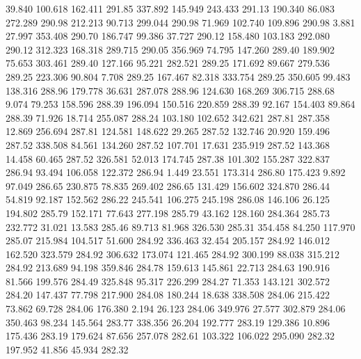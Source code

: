   39.840  100.618  162.411       291.85
 337.892  145.949  243.433       291.13
 190.340   86.083  272.289       290.98
 212.213   90.713  299.044       290.98
  71.969  102.740  109.896       290.98
   3.881   27.997  353.408       290.70
 186.747   99.386   37.727       290.12
 158.480  103.183  292.080       290.12
 312.323  168.318  289.715       290.05
 356.969   74.795  147.260       289.40
 189.902   75.653  303.461       289.40
 127.166   95.221  282.521       289.25
 171.692   89.667  279.536       289.25
 223.306   90.804    7.708       289.25
 167.467   82.318  333.754       289.25
 350.605   99.483  138.316       288.96
 179.778   36.631  287.078       288.96
 124.630  168.269  306.715       288.68
   9.074   79.253  158.596       288.39
 196.094  150.516  220.859       288.39
  92.167  154.403   89.864       288.39
  71.926   18.714  255.087       288.24
 103.180  102.652  342.621       287.81
 287.358   12.869  256.694       287.81
 124.581  148.622   29.265       287.52
 132.746   20.920  159.496       287.52
 338.508   84.561  134.260       287.52
 107.701   17.631  235.919       287.52
 143.368   14.458   60.465       287.52
 326.581   52.013  174.745       287.38
 101.302  155.287  322.837       286.94
  93.494  106.058  122.372       286.94
   1.449   23.551  173.314       286.80
 175.423    9.892   97.049       286.65
 230.875   78.835  269.402       286.65
 131.429  156.602  324.870       286.44
  54.819   92.187  152.562       286.22
 245.541  106.275  245.198       286.08
 146.106   26.125  194.802       285.79
 152.171   77.643  277.198       285.79
  43.162  128.160  284.364       285.73
 232.772   31.021   13.583       285.46
  89.713   81.968  326.530       285.31
 354.458   84.250  117.970       285.07
 215.984  104.517   51.600       284.92
 336.463   32.454  205.157       284.92
 146.012  162.520  323.579       284.92
 306.632  173.074  121.465       284.92
 300.199   88.038  315.212       284.92
 213.689   94.198  359.846       284.78
 159.613  145.861   22.713       284.63
 190.916   81.566  199.576       284.49
 325.848   95.317  226.299       284.27
  71.353  143.121  302.572       284.20
 147.437   77.798  217.900       284.08
 180.244   18.638  338.508       284.06
 215.422   73.862   69.728       284.06
 176.380    2.194   26.123       284.06
 349.976   27.577  302.879       284.06
 350.463   98.234  145.564       283.77
 338.356   26.204  192.777       283.19
 129.386   10.896  175.436       283.19
 179.624   87.656  257.078       282.61
 103.322  106.022  295.090       282.32
 197.952   41.856   45.934       282.32
